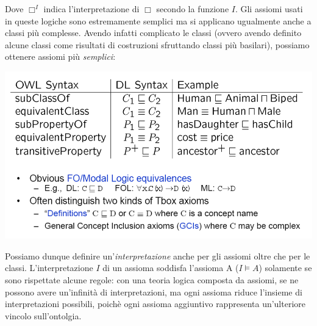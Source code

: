 \documentclass[11pt]{article}
\begin{document}
Dove $\Box^I$ indica l'interpretazione di $\Box$ secondo la funzione $I$. \newline
Gli assiomi usati in queste logiche sono estremamente semplici ma si applicano ugualmente anche a classi più complesse. Avendo infatti complicato le classi (ovvero avendo definito alcune classi come risultati di costruzioni sfruttando classi più basilari), possiamo ottenere assiomi più \textit{semplici}:
\begin{center}
\includegraphics[scale=0.6]{IMG4.png}
\end{center}
Possiamo dunque definire un'\textit{interpretazione} anche per gli assiomi oltre che per le classi.
L'interpretazione $I$ di un assioma soddisfa l'assioma A ($I \models A$) solamente se sono rispettate alcune regole: con una teoria logica composta da assiomi, se ne possono avere un'infinità di interpretazioni, ma ogni assioma riduce l'insieme di interpretazioni possibili, poichè ogni assioma aggiuntivo rappresenta un'ulteriore vincolo sull'ontolgia.
\end{document}
